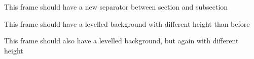 \documentclass[
  10pt,
  aspectratio=169,
  xcolor={dvipsnames,table,x11names},  %
]{beamer}
\begin{document}
\UpdateGWthemeOptions[secsubsecseparator=\GWthemeStarredbullet]

\begin{frame}
  This frame should have a new separator between section and subsection
\end{frame}


{
\LevelledBGLine{0.2\paperheight}

\begin{frame}
  This frame should have a levelled background with different height than before
\end{frame}

}


\UpdateGWthemeOptions[upperleftbg=0.06\paperheight, upperrightbg=0.06\paperheight]

\begin{frame}
  This frame should also have a levelled background, but again with different height
\end{frame}
\end{document}

